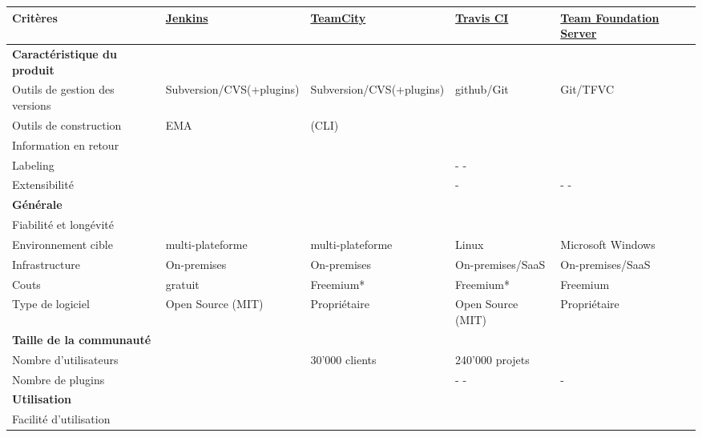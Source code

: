 \newpage
\begin{landscape}
\begin{table}[H]
	\centering
		\begin{tabular}{lp{4cm}p{4cm}p{4cm}p{4cm}} \toprule
			\textbf{Critères} & \href{https://jenkins-ci.org}{\textbf{Jenkins}} & \href{https://www.jetbrains.com/teamcity/}{\textbf{TeamCity}} & \href{https://travis-ci.org}{\textbf{Travis CI}} & \href{https://www.visualstudio.com/en-us/products/tfs-overview-vs.aspx}{\textbf{Team Foundation Server}} \\ \midrule
			\rowcolor{GrayRow}\textbf{Caractéristique du produit} &  &  &  &  \\ \midrule[0.16em]
			Outils de gestion des versions & Subversion/CVS(+plugins) & Subversion/CVS(+plugins) & github/Git & Git/TFVC \\ \midrule
			Outils de construction & EMA & \checkmark\checkmark (CLI) & \checkmark & \\ \midrule
			Information en retour & & \checkmark & \checkmark\checkmark & \\ \midrule
			Labeling & & \checkmark & - - & \\ \midrule
			Extensibilité & \checkmark\checkmark & \checkmark & - & - - \\ \midrule
			\rowcolor{GrayRow}\textbf{Générale} &  &  &  &  \\ \midrule[0.16em]
			Fiabilité et longévité & \checkmark\checkmark & \checkmark\checkmark & \checkmark\checkmark & \checkmark\checkmark \\ \midrule
			Environnement cible & multi-plateforme & multi-plateforme & Linux & Microsoft Windows \\ \midrule
			Infrastructure & On-premises & On-premises & On-premises/SaaS & On-premises/SaaS \\ \midrule
			Couts & gratuit & Freemium* & Freemium* & Freemium \\ \midrule
			Type de logiciel & Open Source (MIT) & Propriétaire & Open Source (MIT) & Propriétaire \\ \midrule
			\rowcolor{GrayRow}\textbf{Taille de la communauté} & & & & \\ \midrule[0.16em]
			Nombre d'utilisateurs &  & 30'000 clients & 240'000 projets &  \\ \midrule
			Nombre de plugins & \checkmark\checkmark & \checkmark & - - & - \\ \midrule
			\rowcolor{GrayRow}\textbf{Utilisation} &  &  &  &  \\ \midrule[0.16em]
			Facilité d'utilisation &  & \checkmark & \checkmark\checkmark &  \\ \midrule

\end{tabular}
\end{table}
\end{landscape}
